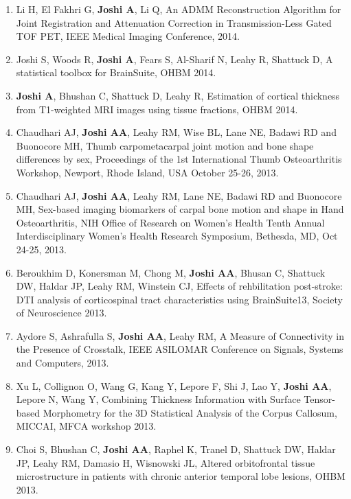 \documentclass[overlapped,line,letterpaper]{res}
\begin{document}
\begin{resume}
\begin{enumerate}
    \item Li H, El Fakhri G, \textbf{Joshi A}, Li Q, {An ADMM Reconstruction Algorithm for Joint Registration and Attenuation Correction in Transmission-Less Gated TOF PET}, IEEE Medical Imaging Conference, 2014.


    \item Joshi S, Woods R, \textbf{Joshi A}, Fears S, Al-Sharif N, Leahy R, Shattuck D, {A statistical toolbox for BrainSuite}, OHBM 2014.

    \item \textbf{Joshi A}, Bhushan C, Shattuck D, Leahy R, {Estimation of cortical thickness from T1-weighted MRI images using tissue fractions}, OHBM 2014.

    \item Chaudhari AJ, \textbf{Joshi AA}, Leahy RM, Wise BL, Lane NE, Badawi RD and Buonocore MH, {Thumb carpometacarpal joint motion and bone shape differences by sex}, Proceedings of the 1st International Thumb Osteoarthritis Workshop, Newport, Rhode Island, USA October 25-26, 2013.

    \item Chaudhari AJ, \textbf{Joshi AA}, Leahy RM, Lane NE, Badawi RD and Buonocore MH, {Sex-based imaging biomarkers of carpal bone motion and shape in Hand Osteoarthritis}, NIH Office of Research on Women's Health Tenth Annual Interdisciplinary Women's Health Research Symposium, Bethesda, MD, Oct 24-25, 2013.

    \item Beroukhim D, Konersman M, Chong M, \textbf{Joshi AA}, Bhusan C, Shattuck DW, Haldar JP, Leahy RM, Winstein CJ, {Effects of rehbilitation post-stroke: DTI analysis of corticospinal tract characteristics using BrainSuite13}, Society of Neuroscience 2013.

    \item Aydore S, Ashrafulla S, \textbf{Joshi AA}, Leahy RM, {A Measure of Connectivity in the Presence of Crosstalk}, IEEE ASILOMAR Conference on Signals, Systems and Computers, 2013.

    \item Xu L, Collignon O, Wang G, Kang Y, Lepore F, Shi J, Lao Y, \textbf{Joshi AA}, Lepore N, Wang Y, {Combining Thickness Information with Surface Tensor-based Morphometry for the 3D Statistical Analysis of the Corpus Callosum}, MICCAI, MFCA workshop 2013.

    \item Choi S, Bhushan C, \textbf{Joshi AA}, Raphel K, Tranel D, Shattuck DW, Haldar JP, Leahy RM, Damasio H, Wisnowski JL, {Altered orbitofrontal tissue microstructure in patients with chronic anterior temporal lobe lesions}, OHBM 2013.


\end{enumerate}
\end{resume}
\end{document}
